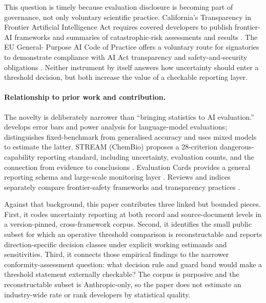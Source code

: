 \documentclass{article}
\begin{document}
This question is timely because evaluation disclosure is becoming part of governance, not
only voluntary scientific practice. California's Transparency in Frontier Artificial
Intelligence Act requires covered developers to publish frontier-AI frameworks and summaries
of catastrophic-risk assessments and results \citep{california2025sb53}. The EU General-
Purpose AI Code of Practice offers a voluntary route for signatories to demonstrate
compliance with AI Act transparency and safety-and-security obligations
\citep{europeancommission2025gpaicode}. Neither instrument by itself answers how uncertainty
should enter a threshold decision, but both increase the value of a checkable reporting
layer.

\paragraph{Relationship to prior work and contribution.}
The novelty is deliberately narrower than ``bringing statistics to AI evaluation.''
\citet{miller2024adding} develops error bars and power analysis for language-model
evaluations; \citet{keller2026nist} distinguishes fixed-benchmark from generalised accuracy
and uses mixed models to estimate the latter. STREAM (ChemBio) proposes a 28-criterion
dangerous-capability reporting standard, including uncertainty, evaluation counts, and the
connection from evidence to conclusions \citep{mccaslin2025stream}. Evaluation Cards
provides a general reporting schema and large-scale monitoring layer
\citep{ghosh2026evaluationcards}. Reviews and indices separately compare frontier-safety
frameworks and transparency practices
\citep{stelling2025evaluating,tong2026foresight,fli2025index,bommasani2023fmti}.

Against that background, this paper contributes three linked but bounded pieces. First, it
codes uncertainty reporting at both record and source-document levels in a version-pinned,
cross-framework corpus. Second, it identifies the small public subset for which an operative
threshold comparison is reconstructable and reports direction-specific decision classes
under explicit working estimands and sensitivities. Third, it connects those empirical
findings to the narrower conformity-assessment question: what decision rule and guard band
would make a threshold statement externally checkable? The corpus is purposive and the
reconstructable subset is Anthropic-only, so the paper does not estimate an industry-wide
rate or rank developers by statistical quality.
\end{document}
